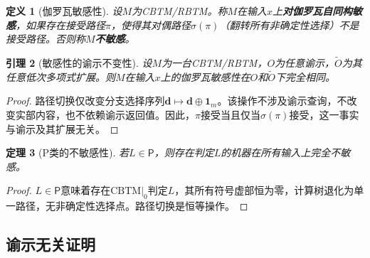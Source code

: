 \documentclass{ctexart}
\newtheorem{theorem}{定理}[section]
\newtheorem{lemma}[theorem]{引理}
\newtheorem{definition}[theorem]{定义}
\newtheorem{proof}[theorem]{证明}
\begin{document}
	\begin{definition}[伽罗瓦敏感性]\label{def:galois-sensitivity}
		设$M$为CBTM/RBTM。称$M$在输入$x$上\textbf{对伽罗瓦自同构敏感}，如果存在接受路径$\pi$，使得其对偶路径$\sigma(\pi)$（翻转所有非确定性选择）不是接受路径。否则称$M$\textbf{不敏感}。
	\end{definition}
	
	\begin{lemma}[敏感性的谕示不变性]\label{lem:sensitivity-invariance}
		设$M$为一台CBTM/RBTM，$O$为任意谕示，$\tilde{O}$为其任意低次多项式扩展。则$M$在输入$x$上的伽罗瓦敏感性在$O$和$\tilde{O}$下完全相同。
	\end{lemma}
	\begin{proof}
		路径切换仅改变分支选择序列$\mathbf{d} \mapsto \mathbf{d} \oplus \mathbf{1}_m$。该操作不涉及谕示查询，不改变实部内容，也不依赖谕示返回值。因此，$\pi$接受当且仅当$\sigma(\pi)$接受，这一事实与谕示及其扩展无关。
	\end{proof}
	
	\begin{theorem}[P类的不敏感性]\label{thm:p-insensitivity}
		若$L \in \mathsf{P}$，则存在判定$L$的机器在所有输入上完全不敏感。
	\end{theorem}
	\begin{proof}
		$L \in \mathsf{P}$意味着存在$\mathrm{CBTM}|_0$判定$L$，其所有符号虚部恒为零，计算树退化为单一路径，无非确定性选择点。路径切换是恒等操作。
	\end{proof}
	
	\subsection{谕示无关证明}
	
\end{document}
